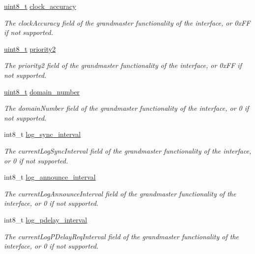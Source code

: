 \begin{DoxyCompactItemize}
\hyperlink{stdint_8h_aba7bc1797add20fe3efdf37ced1182c5}{uint8\+\_\+t} \hyperlink{structg_ptp_time_data_a708d6d971b6be997cf8d3e683951ceb0}{clock\+\_\+accuracy}
\begin{DoxyCompactList}\small\item\em The clock\+Accuracy field of the grandmaster functionality of the interface, or 0x\+FF if not supported. \end{DoxyCompactList}\item 
\hyperlink{stdint_8h_aba7bc1797add20fe3efdf37ced1182c5}{uint8\+\_\+t} \hyperlink{structg_ptp_time_data_ac04b889463a96b43985cb82020e3c39b}{priority2}
\begin{DoxyCompactList}\small\item\em The priority2 field of the grandmaster functionality of the interface, or 0x\+FF if not supported. \end{DoxyCompactList}\item 
\hyperlink{stdint_8h_aba7bc1797add20fe3efdf37ced1182c5}{uint8\+\_\+t} \hyperlink{structg_ptp_time_data_a96702548f5b9222af26319c695764b29}{domain\+\_\+number}
\begin{DoxyCompactList}\small\item\em The domain\+Number field of the grandmaster functionality of the interface, or 0 if not supported. \end{DoxyCompactList}\item 
int8\+\_\+t \hyperlink{structg_ptp_time_data_a2d4950b4c6da4dfa67688dcaf6139c9d}{log\+\_\+sync\+\_\+interval}
\begin{DoxyCompactList}\small\item\em The current\+Log\+Sync\+Interval field of the grandmaster functionality of the interface, or 0 if not supported. \end{DoxyCompactList}\item 
int8\+\_\+t \hyperlink{structg_ptp_time_data_a15bb50a04ecd3ec11563012afc7e24a7}{log\+\_\+announce\+\_\+interval}
\begin{DoxyCompactList}\small\item\em The current\+Log\+Announce\+Interval field of the grandmaster functionality of the interface, or 0 if not supported. \end{DoxyCompactList}\item 
int8\+\_\+t \hyperlink{structg_ptp_time_data_a26544b553c0b251da8e632533f260a5d}{log\+\_\+pdelay\+\_\+interval}
\begin{DoxyCompactList}\small\item\em The current\+Log\+P\+Delay\+Req\+Interval field of the grandmaster functionality of the interface, or 0 if not supported. \end{DoxyCompactList}\item 

\end{DoxyCompactItemize}
